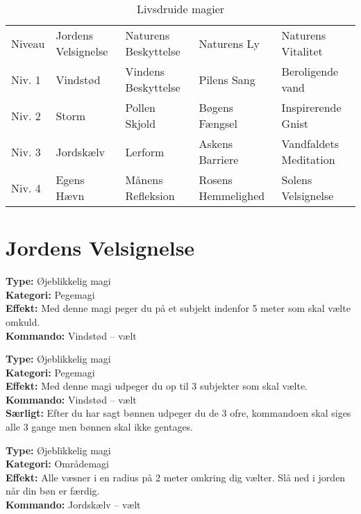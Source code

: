 \begin{table}[H]
    \centering
    \begin{tabular}{|p{}|p{}|p{}|p{}|p{}|}
    \hline
    \rowcolor{cerulean!80}
    \multicolumn{5}{c}{Livsdruide magi}\\
    \hline
    \rowcolor{cerulean!40}
         Niveau & Jordens Velsignelse & Naturens Beskyttelse & Naturens Ly & Naturens Vitalitet \\\hline
        Niv. 1 & Vindstød & Vindens Beskyttelse & Pilens Sang & Beroligende vand\\\hline
        Niv. 2 & Storm & Pollen Skjold & Bøgens Fængsel & Inspirerende Gnist\\\hline
         Niv. 3 & Jordskælv & Lerform & Askens Barriere & Vandfaldets Meditation\\\hline
         Niv. 4 & Egens Hævn & Månens Refleksion & Rosens Hemmelighed & Solens Velsignelse\\\hline
         \end{tabular}
         \caption{Livsdruide magier}
\end{table}
\newpage
\section{Jordens Velsignelse}
\begin{jord*}[Vindstød]
\textbf{Type:} Øjeblikkelig magi\\
\textbf{Kategori:} Pegemagi\\
\textbf{Effekt:} Med denne magi peger du på et subjekt indenfor 5 meter som skal vælte omkuld.\\
\textbf{Kommando:} Vindstød – vælt
\end{jord*}

\begin{jord*}[Storm]
\textbf{Type:} Øjeblikkelig magi\\ 
\textbf{Kategori:} Pegemagi\\
\textbf{Effekt:} Med denne magi udpeger du op til 3 subjekter som skal vælte.\\
\textbf{Kommando:} Vindstød – vælt\\
\textbf{Særligt:} Efter du har sagt bønnen udpeger du de 3 ofre, kommandoen skal siges alle 3 gange men bønnen skal ikke gentages.
\end{jord*}

\begin{jord*}[Jordskælv]
\textbf{Type:} Øjeblikkelig magi\\
\textbf{Kategori:} Områdemagi\\
\textbf{Effekt:} Alle væsner i en radius på 2 meter omkring dig vælter. Slå ned i jorden når din bøn er færdig.\\
\textbf{Kommando:} Jordskælv – vælt
\end{jord*}

